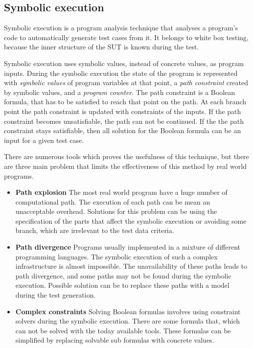 
\subsection{Symbolic execution}
\label{ssub:symbolicexecution}

Symbolic execution is a program analysis technique that analyses a program’s code to automatically generate test cases from it. It belongs to white box testing, because the inner structure of the SUT is known during the test.

Symbolic execution uses symbolic values, instead of concrete values, as program inputs. During the symbolic execution the state of the program is represented with \textit{symbolic values} of program variables at that point, a \textit{path constraint} created by symbolic values, and a \textit{program counter}. The path constraint is a Boolean formula, that has to be satisfied to reach that point on the path. At each branch point the path constraint is updated with constraints of the inputs. If the path constraint becomes unsatisfiable, the path can not be continued. If the the path constraint stays satisfiable, then all solution for the Boolean formula can be an input for a given test case.

There are numerous tools which proves the usefulness of this technique, but there are three main problem that limits the effectiveness of this method by real world programs.

\begin{itemize}
	\item \textbf{Path explosion} The most real world program have a huge number of computational path. The execution of each path can be mean an unacceptable overhead. Solutions for this problem can be using the specification of the parts that affect the symbolic execution or avoiding some branch, which are irrelevant to the test data criteria.
	\item \textbf{Path divergence} Programs usually implemented in a mixture of different programming languages. The symbolic execution of such a complex infrastructure is almost impossible. The unavailability of these paths leads to path divergence, and some paths may not be found during the symbolic execution. Possible solution can be to replace these paths with a model during the test generation.
	\item \textbf{Complex constraints} Solving Boolean formulas involves using constraint solvers during the symbolic execution. There are some formula that, which can not be solved with the today available tools. These formulas can be simplified by replacing solvable sub formulas with concrete values.
\end{itemize}

